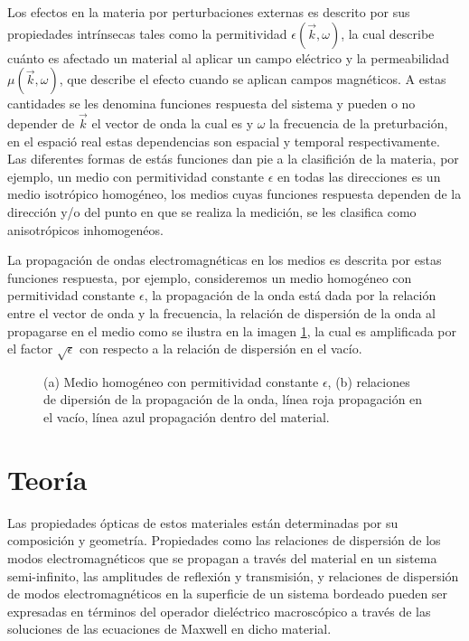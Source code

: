 \documentclass[12pt]{article}
\begin{document}
Los efectos en la materia por perturbaciones externas es descrito por
sus propiedades intrínsecas tales como la permitividad
$\epsilon(\vec{k},\omega)$, la cual describe cuánto es afectado un
material al aplicar un campo eléctrico y la permeabilidad
$\mu(\vec{k},\omega)$, que describe el efecto cuando se aplican campos
magnéticos. A estas cantidades se les denomina funciones respuesta del
sistema y pueden o no depender de $\vec{k}$ el vector de onda la cual
es y $\omega$ la frecuencia de la preturbación, en el espació real
estas dependencias son espacial y temporal respectivamente. Las
diferentes formas de estás funciones dan pie a la clasifición de la
materia, por ejemplo, un medio con permitividad constante $\epsilon$
en todas las direcciones es un medio isotrópico homogéneo, los medios
cuyas funciones respuesta dependen de la dirección y/o del punto en
que se realiza la medición, se les clasifica como anisotrópicos
inhomogenéos.

La propagación de ondas electromagnéticas en los medios es descrita
por estas funciones respuesta, por ejemplo, consideremos un medio
homogéneo con permitividad constante $\epsilon$, la propagación de la
onda está dada por la relación entre el vector de onda y la
frecuencia, la relación de dispersión de la onda al propagarse en el
medio como se ilustra en la imagen \ref{mediohomogneo}, la cual es
amplificada por el factor $\sqrt{\epsilon}$ con respecto a la relación
de dispersión en el vacío.
\begin{figure}
  \centering
  

  \caption{(a) Medio homogéneo con permitividad constante $\epsilon$,
    (b) relaciones de dipersión de la propagación de la onda, línea
    roja propagación en el vacío, línea azul propagación dentro del material.}
\label{mediohomogneo}

\end{figure}


\section{Teoría}

Las propiedades ópticas de estos materiales están determinadas por su
composición y geometría. Propiedades como las relaciones de dispersión
de los modos electromagnéticos que se propagan a través del material
en un sistema semi-infinito, las amplitudes de reflexión y transmisión,
y relaciones de dispersión de modos electromagnéticos en la superficie
de un sistema bordeado pueden ser expresadas en términos del operador
dieléctrico macroscópico a través de las soluciones de las ecuaciones
de Maxwell en dicho material.
\end{document}
